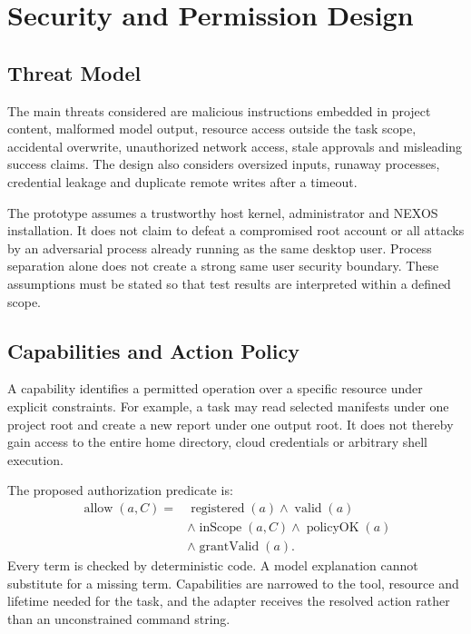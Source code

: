 \chapter{Security and Permission Design}
\section{Threat Model}
The main threats considered are malicious instructions embedded in project content, malformed model output, resource access outside the task scope, accidental overwrite, unauthorized network access, stale approvals and misleading success claims. The design also considers oversized inputs, runaway processes, credential leakage and duplicate remote writes after a timeout.

The prototype assumes a trustworthy host kernel, administrator and NEXOS installation. It does not claim to defeat a compromised root account or all attacks by an adversarial process already running as the same desktop user. Process separation alone does not create a strong same user security boundary. These assumptions must be stated so that test results are interpreted within a defined scope.

\section{Capabilities and Action Policy}
A capability identifies a permitted operation over a specific resource under explicit constraints. For example, a task may read selected manifests under one project root and create a new report under one output root. It does not thereby gain access to the entire home directory, cloud credentials or arbitrary shell execution.

The proposed authorization predicate is:
\begin{equation}
\begin{aligned}
\operatorname{allow}(a,C)={}&\operatorname{registered}(a)\land\operatorname{valid}(a)\\
&\land\operatorname{inScope}(a,C)\land\operatorname{policyOK}(a)\\
&\land\operatorname{grantValid}(a).
\end{aligned}
\end{equation}
Every term is checked by deterministic code. A model explanation cannot substitute for a missing term. Capabilities are narrowed to the tool, resource and lifetime needed for the task, and the adapter receives the resolved action rather than an unconstrained command string.

